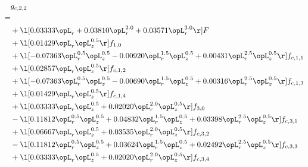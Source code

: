 \begin{alignat}{2} 
\label{eq:g_22_0} 
& g_{c,2,2} \nonumber \\ 
 = \\ 
& + \l[  0.03333 \opL_r +  0.03810 \opL_r^{2.0} +  0.03571 \opL_r^{3.0}  \r] F \nonumber \\ 
& + \l[  0.01429 \opL_r \opL_z^{0.5}  \r] f_{1,0} \nonumber \\ 
& + \l[  -0.07363 \opL_r^{0.5} \opL_z^{0.5}   -0.00920 \opL_r^{1.5} \opL_z^{0.5} +  0.00431 \opL_r^{2.5} \opL_z^{0.5}  \r] f_{c,1,1} \nonumber \\ 
& + \l[  0.02857 \opL_r \opL_z^{0.5}  \r] f_{c,1,2} \nonumber \\ 
& + \l[  -0.07363 \opL_r^{0.5} \opL_z^{0.5}   -0.00690 \opL_r^{1.5} \opL_z^{0.5} +  0.00316 \opL_r^{2.5} \opL_z^{0.5}  \r] f_{c,1,3} \nonumber \\ 
& + \l[  0.01429 \opL_r \opL_z^{0.5}  \r] f_{c,1,4} \nonumber \\ 
& + \l[  0.03333 \opL_r \opL_z^{0.5} +  0.02020 \opL_r^{2.0} \opL_z^{0.5}  \r] f_{3,0} \nonumber \\ 
& - \l[  0.11812 \opL_r^{0.5} \opL_z^{0.5} +  0.04832 \opL_r^{1.5} \opL_z^{0.5} +  0.03398 \opL_r^{2.5} \opL_z^{0.5}  \r] f_{c,3,1} \nonumber \\ 
& + \l[  0.06667 \opL_r \opL_z^{0.5} +  0.03535 \opL_r^{2.0} \opL_z^{0.5}  \r] f_{c,3,2} \nonumber \\ 
& - \l[  0.11812 \opL_r^{0.5} \opL_z^{0.5} +  0.03624 \opL_r^{1.5} \opL_z^{0.5} +  0.02492 \opL_r^{2.5} \opL_z^{0.5}  \r] f_{c,3,3} \nonumber \\ 
& + \l[  0.03333 \opL_r \opL_z^{0.5} +  0.02020 \opL_r^{2.0} \opL_z^{0.5}  \r] f_{c,3,4} \nonumber \\ 
\end{alignat} 


